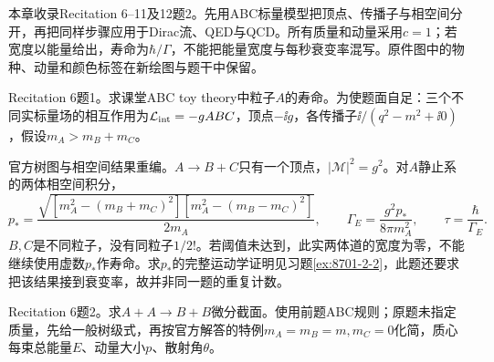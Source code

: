 本章收录Recitation 6--11及12题2。先用ABC标量模型把顶点、传播子与相空间分开，再把同样步骤应用于Dirac流、QED与QCD。所有质量和动量采用$c=1$；若宽度以能量给出，寿命为$\hbar/\Gamma$，不能把能量宽度与每秒衰变率混写。原件图中的物种、动量和颜色标签在新绘图与题干中保留。
\begin{exercise}\label{ex:rec-6-1}
Recitation 6题1。求课堂ABC toy theory中粒子$A$的寿命。为使题面自足：三个不同实标量场的相互作用为$\mathcal L_{\rm int}=-gABC$，顶点$-\ii g$，各传播子$\ii/(q^2-m^2+\ii0)$，假设$m_A>m_B+m_C$。
\end{exercise}
\begin{solution}
官方树图与相空间结果重编。$A\to B+C$只有一个顶点，$|\mathcal M|^2=g^2$。对$A$静止系的两体相空间积分，
\begin{equation}
 p_* =\frac{\sqrt{[m_A^2-(m_B+m_C)^2][m_A^2-(m_B-m_C)^2]}}{2m_A},
 \qquad\Gamma_E=\frac{g^2p_*}{8\pi m_A^2},\qquad\tau=\frac{\hbar}{\Gamma_E}.
\end{equation}
$B,C$是不同粒子，没有同粒子$1/2!$。若阈值未达到，此实两体道的宽度为零，不能继续使用虚数$p_*$作寿命。求$p_*$的完整运动学证明见习题\ref{ex:8701-2-2}，此题还要求把该结果接到衰变率，故并非同一题的重复计数。
\begin{center}\end{center}
\end{solution}
\begin{exercise}\label{ex:rec-6-2}
Recitation 6题2。求$A+A\to B+B$微分截面。使用前题ABC规则；原题未指定质量，先给一般树级式，再按官方解答的特例$m_A=m_B=m,m_C=0$化简，质心每束总能量$E$、动量大小$p$、散射角$\theta$。
\end{exercise}
